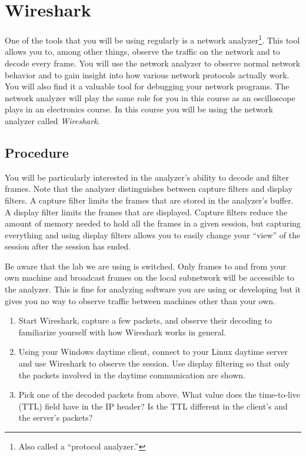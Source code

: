 \documentclass[twocolumn]{article}
\begin{document}
\section{Wireshark}

One of the tools that you will be using regularly is a network analyzer\footnote{Also called a
  ``protocol analyzer.''}. This tool allows you to, among other things, observe the traffic on
the network and to decode every frame. You will use the network analyzer to observe normal
network behavior and to gain insight into how various network protocols actually work. You will
also find it a valuable tool for debugging your network programs. The network analyzer will play
the same role for you in this course as an oscilloscope plays in an electronics course. In this
course you will be using the network analyzer called \textit{Wireshark}.

\subsection*{Procedure}

You will be particularly interested in the analyzer's ability to decode and filter frames. Note
that the analyzer distinguishes between capture filters and display filters. A capture filter
limits the frames that are stored in the analyzer's buffer. A display filter limits the frames
that are displayed. Capture filters reduce the amount of memory needed to hold all the frames in
a given session, but capturing everything and using display filters allows you to easily change
your ``view'' of the session after the session has ended.

Be aware that the lab we are using is switched. Only frames to and from your own machine and
broadcast frames on the local subnetwork will be accessible to the analyzer. This is fine for
analyzing software you are using or developing but it gives you no way to observe traffic
between machines other than your own.

\begin{enumerate}

\item Start Wireshark, capture a few packets, and observe their decoding to familiarize yourself
  with how Wireshark works in general.

\item Using your Windows daytime client, connect to your Linux daytime server and use Wireshark
  to observe the session. Use display filtering so that only the packets involved in the daytime
  communication are shown.
  
\item Pick one of the decoded packets from above. What value does the time-to-live (TTL) field
  have in the IP header? Is the TTL different in the client's and the server's packets?

\end{enumerate}
\end{document}

